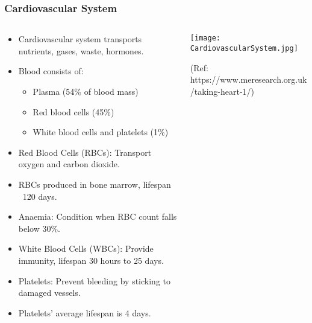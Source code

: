 \begin{frame}[fragile]\frametitle{Cardiovascular System}
\begin{columns}
    \begin{column}[T]{0.6\linewidth}
      \begin{itemize}
		\item Cardiovascular system transports nutrients, gases, waste, hormones.
		\item Blood consists of:
			\begin{itemize}
				\item Plasma (54\% of blood mass)
				\item Red blood cells (45\%)
				\item White blood cells and platelets (1\%)
			\end{itemize}
		\item Red Blood Cells (RBCs): Transport oxygen and carbon dioxide.
		\item RBCs produced in bone marrow, lifespan ~120 days.
		\item Anaemia: Condition when RBC count falls below 30\%.
		\item White Blood Cells (WBCs): Provide immunity, lifespan 30 hours to 25 days.
		\item Platelets: Prevent bleeding by sticking to damaged vessels.
		\item Platelets' average lifespan is 4 days.
	  \end{itemize}
    \end{column}
    \begin{column}[T]{0.4\linewidth}
		\begin{center}
		\texttt{[image: CardiovascularSystem.jpg]}
		
				
		{\tiny (Ref: https://www.meresearch.org.uk/taking-heart-1/)}		
		\end{center}	
    \end{column}
  \end{columns}
\end{frame}

